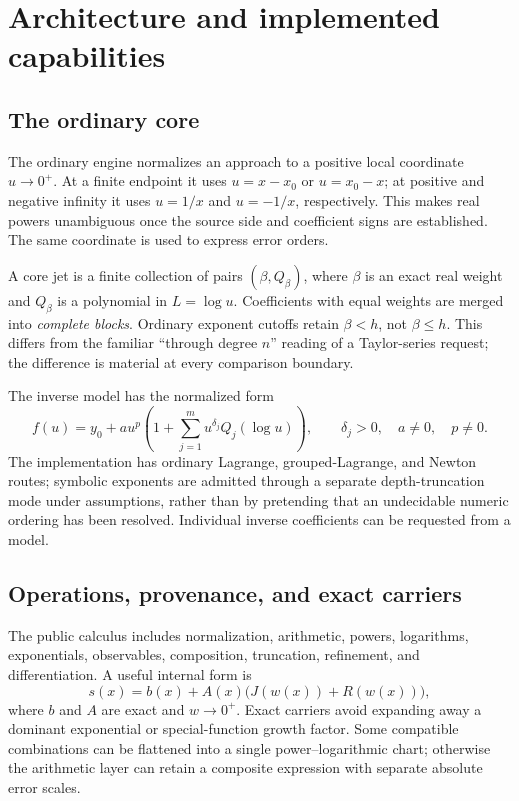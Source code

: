 \documentclass[11pt,a4paper]{article}
\begin{document}
\section{Architecture and implemented capabilities}\label{sec:architecture}

\subsection{The ordinary core}

The ordinary engine normalizes an approach to a positive local coordinate $u\to0^+$. At a finite endpoint it uses $u=x-x_0$ or $u=x_0-x$; at positive and negative infinity it uses $u=1/x$ and $u=-1/x$, respectively. This makes real powers unambiguous once the source side and coefficient signs are established. The same coordinate is used to express error orders.\cite{core,guide}

A core jet is a finite collection of pairs $(\beta,Q_\beta)$, where $\beta$ is an exact real weight and $Q_\beta$ is a polynomial in $L=\log u$. Coefficients with equal weights are merged into \emph{complete blocks}. Ordinary exponent cutoffs retain $\beta<h$, not $\beta\le h$. This differs from the familiar ``through degree $n$'' reading of a Taylor-series request; the difference is material at every comparison boundary.

The inverse model has the normalized form
\begin{equation}\label{eq:model}
 f(u)=y_0+a u^p\left(1+\sum_{j=1}^m u^{\delta_j}Q_j(\log u)\right),
 \qquad \delta_j>0,\quad a\ne0,\quad p\ne0.
\end{equation}
The implementation has ordinary Lagrange, grouped-Lagrange, and Newton routes; symbolic exponents are admitted through a separate depth-truncation mode under assumptions, rather than by pretending that an undecidable numeric ordering has been resolved. Individual inverse coefficients can be requested from a model.\cite{core}

\subsection{Operations, provenance, and exact carriers}

The public calculus includes normalization, arithmetic, powers, logarithms, exponentials, observables, composition, truncation, refinement, and differentiation. A useful internal form is
\begin{equation}\label{eq:representation}
 s(x)=b(x)+A(x)\bigl(J(w(x))+R(w(x))\bigr),
\end{equation}
where $b$ and $A$ are exact and $w\to0^+$. Exact carriers avoid expanding away a dominant exponential or special-function growth factor. Some compatible combinations can be flattened into a single power--logarithmic chart; otherwise the arithmetic layer can retain a composite expression with separate absolute error scales.\cite{ops,arithmetic,native}
\end{document}
